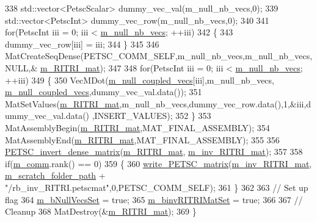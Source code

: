 \begin{DoxyCode}
338     std::vector<PetscScalar> dummy\_vec\_val(m\_null\_nb\_vecs,0);
339     std::vector<PetscInt>    dummy\_vec\_row(m\_null\_nb\_vecs,0);
340 
341     \textcolor{keywordflow}{for}(PetscInt iii = 0; iii < \hyperlink{classcarl_1_1_f_e_t_i___operations_a6be71b08544858c4b4609bf2a2927a17}{m\_null\_nb\_vecs}; ++iii)
342     \{
343         dummy\_vec\_row[iii] = iii;
344     \}
345 
346     MatCreateSeqDense(PETSC\_COMM\_SELF,m\_null\_nb\_vecs,m\_null\_nb\_vecs,NULL,&
      \hyperlink{classcarl_1_1_f_e_t_i___operations_aaad5dcc66e63627427b79d5e22b3df6f}{m\_RITRI\_mat});
347 
348     \textcolor{keywordflow}{for}(PetscInt iii = 0; iii < \hyperlink{classcarl_1_1_f_e_t_i___operations_a6be71b08544858c4b4609bf2a2927a17}{m\_null\_nb\_vecs}; ++iii)
349     \{
350         VecMDot(\hyperlink{classcarl_1_1_f_e_t_i___operations_a162af22ae7e7410cf5ce6fe07f301e63}{m\_null\_coupled\_vecs}[iii],m\_null\_nb\_vecs,
      \hyperlink{classcarl_1_1_f_e_t_i___operations_a162af22ae7e7410cf5ce6fe07f301e63}{m\_null\_coupled\_vecs},dummy\_vec\_val.data());
351         MatSetValues(\hyperlink{classcarl_1_1_f_e_t_i___operations_aaad5dcc66e63627427b79d5e22b3df6f}{m\_RITRI\_mat},m\_null\_nb\_vecs,dummy\_vec\_row.data(),1,&iii,dummy\_vec\_val.data()
      ,INSERT\_VALUES);
352     \}
353     MatAssemblyBegin(\hyperlink{classcarl_1_1_f_e_t_i___operations_aaad5dcc66e63627427b79d5e22b3df6f}{m\_RITRI\_mat},MAT\_FINAL\_ASSEMBLY);
354     MatAssemblyEnd(\hyperlink{classcarl_1_1_f_e_t_i___operations_aaad5dcc66e63627427b79d5e22b3df6f}{m\_RITRI\_mat},MAT\_FINAL\_ASSEMBLY);
355 
356     \hyperlink{namespacecarl_aa3e9c0c8132625807ce645c290edf17f}{PETSC\_invert\_dense\_matrix}(\hyperlink{classcarl_1_1_f_e_t_i___operations_aaad5dcc66e63627427b79d5e22b3df6f}{m\_RITRI\_mat},
      \hyperlink{classcarl_1_1_f_e_t_i___operations_a5b61754f3ea2e4c674fd37f18ec0014b}{m\_inv\_RITRI\_mat});
357 
358     \textcolor{keywordflow}{if}(\hyperlink{classcarl_1_1_f_e_t_i___operations_a8cb0ed286667fc9f3ebc2d8ef2a3e13b}{m\_comm}.rank() == 0)
359     \{
360         \hyperlink{namespacecarl_a431936850bf5712121d8399ddbd76aa8}{write\_PETSC\_matrix}(\hyperlink{classcarl_1_1_f_e_t_i___operations_a5b61754f3ea2e4c674fd37f18ec0014b}{m\_inv\_RITRI\_mat},
      \hyperlink{classcarl_1_1_f_e_t_i___operations_ad6d35bc9b5221d45452fbc8931f22055}{m\_scratch\_folder\_path} + \textcolor{stringliteral}{"/rb\_inv\_RITRI.petscmat"},0,PETSC\_COMM\_SELF);
361     \}
362 
363     \textcolor{comment}{// Set up flag}
364     \hyperlink{classcarl_1_1_f_e_t_i___operations_a96f6ef39dd083e2f659cc0be7e35ff19}{m\_bNullVecsSet} = \textcolor{keyword}{true};
365     \hyperlink{classcarl_1_1_f_e_t_i___operations_a259bd691984bbbaa20dcf151adc9bc78}{m\_binvRITRIMatSet} = \textcolor{keyword}{true};
366 
367     \textcolor{comment}{// Cleanup}
368     MatDestroy(&\hyperlink{classcarl_1_1_f_e_t_i___operations_aaad5dcc66e63627427b79d5e22b3df6f}{m\_RITRI\_mat});
369 \}
\end{DoxyCode}
\hypertarget{classcarl_1_1_f_e_t_i___operations_a55fb42247284b7468ebe6440b7c48bef}{}

